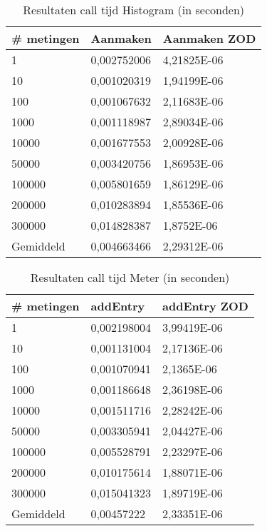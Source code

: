\begin{table}[]
\centering
\begin{tabular}{|l|l|l|}
\hline
\# metingen & Aanmaken    & Aanmaken ZOD \\ \hline
1           & 0,002752006 & 4,21825E-06  \\ \hline
10          & 0,001020319 & 1,94199E-06  \\ \hline
100         & 0,001067632 & 2,11683E-06  \\ \hline
1000        & 0,001118987 & 2,89034E-06  \\ \hline
10000       & 0,001677553 & 2,00928E-06  \\ \hline
50000       & 0,003420756 & 1,86953E-06  \\ \hline
100000      & 0,005801659 & 1,86129E-06  \\ \hline
200000      & 0,010283894 & 1,85536E-06  \\ \hline
300000      & 0,014828387 & 1,8752E-06   \\ \hline
Gemiddeld   & 0,004663466 & 2,29312E-06  \\ \hline
\end{tabular}
\caption{Resultaten call tijd Histogram (in seconden)}
\label{Table:Histogram}
\end{table}


\begin{table}[]
\centering
\begin{tabular}{|l|l|l|}
\hline
\# metingen & addEntry    & addEntry ZOD \\ \hline
1           & 0,002198004 & 3,99419E-06  \\ \hline
10          & 0,001131004 & 2,17136E-06  \\ \hline
100         & 0,001070941 & 2,1365E-06   \\ \hline
1000        & 0,001186648 & 2,36198E-06  \\ \hline
10000       & 0,001511716 & 2,28242E-06  \\ \hline
50000       & 0,003305941 & 2,04427E-06  \\ \hline
100000      & 0,005528791 & 2,23297E-06  \\ \hline
200000      & 0,010175614 & 1,88071E-06  \\ \hline
300000      & 0,015041323 & 1,89719E-06  \\ \hline
Gemiddeld   & 0,00457222  & 2,33351E-06  \\ \hline
\end{tabular}
\caption{Resultaten call tijd Meter (in seconden)}
\label{Table:Meter}
\end{table}

